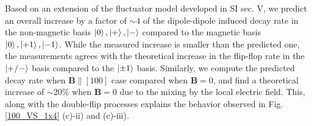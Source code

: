 \documentclass[preprintnumbers,amsmath,amssymb,superscriptaddress,twocolumn,showpacs]{revtex4-2}
\begin{document}
Based on an extension of the fluctuator model developed in SI sec. V, we predict an overall increase by a factor of $\sim 4$ of the dipole-dipole induced decay rate in the non-magnetic basis $\ket{0}, \ket{+}, \ket{-}$ compared to the magnetic basis $\ket{0}, \ket{+1}, \ket{-1}$. While the measured increase is smaller than the predicted one, the measurements agrees with the theoretical increase in the flip-flop rate in the $\ket{+/-}$ basis compared to the $\ket{\pm 1}$ basis. Similarly, we compute the predicted decay rate when $\bm B \parallel \left[100\right]$ case compared when $\bm B = 0$, and find a theoretical increase of $\sim 20\%$ when $\bm B = 0$ due to the mixing by the local electric field. This, along with the double-flip processes explains the behavior observed in Fig. \ref{100_VS_1x4} (c)-ii) and (c)-iii).
\end{document}

